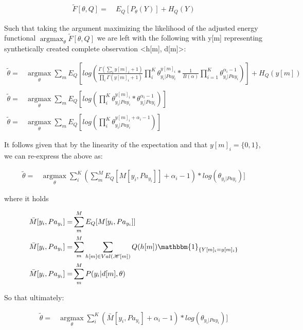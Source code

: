 \documentclass[11pt]{article}
\begin{document}
\begin{article}
\begin{align} \label{eq:dirichlet-multinomial-likelihood}
\tilde{F}[\theta, Q] =& \ E_Q[P_\theta(Y)] + H_Q (Y)
\end{align}

Such that taking the argument maximizing the likelihood of the
adjusted energy functional \(\operatorname*{argmax}_{\theta}
    \tilde{F}[\theta, Q]\) we are left with the following with y[m]
representing synthetically created complete observation <h[m],
d[m]>:

\begin{align} \label{eq:first-order-condition}
\tilde{\theta} =& \operatorname*{argmax}_{\theta} \sum_m E_Q[log(\frac{\Gamma(\sum_i y[m]_i + 1)}{\prod_i \Gamma(y[m]_i + 1)} \prod_i^K \theta_{y_i | Pa{y_i}}^{y[m]_i} * \frac{1}{B(\alpha)} \prod_{i=1}^K \theta_{y_i | Pa{y_i}}^{\alpha_i - 1})] + H_Q (y[m]) \\
\nonumber\\   
\tilde{\theta} =& \operatorname*{argmax}_{\theta} \sum_m E_Q[log(\prod_i^K \theta_{y_i | Pa{y_i}}^{y[m]_i} * \theta_{y_i | Pa{y_i}}^{\alpha_i - 1})]\\
\nonumber\\   
\tilde{\theta} =& \operatorname*{argmax}_{\theta} \sum_m E_Q[log(\prod_i^K \theta_{y_i | Pa{y_i}}^{y[m]_i + \alpha_i - 1})] 
\end{align}

It follows given that by the linearity of the expectation and that
\(y[m]_i = \{0,1\}\), we can re-express the above as:

\begin{align} \label{eq:solution1}
\tilde{\theta} =& \operatorname*{argmax}_{\theta} \sum_i^K (\sum_m^M E_Q[M[y_i, Pa_{y_i}]] + \alpha_i - 1) * log(\theta_{y_i | Pa{y_i}})] 
\end{align}

where it holds

\begin{align} \label{eq:expected_sufficient}
\bar{M}[y_i, Pa_{y_i}]  =& \sum_m^M E_Q[M[y_i, Pa_{y_i}]]\\
\bar{M}[y_i, Pa_{y_i}]  =& \sum_m^M \sum_{h[m] \in Val(\mathscr{H}[m])} Q(h[m]) \mathbbm{1}_{\{Y[m]_i = y[m]_i\}}\\
\bar{M}[y_i, Pa_{y_i}]  =& \sum_m^M P(y_i | d[m], \theta)
\end{align}

So that ultimately:

\begin{align} \label{eq:solution2}
\tilde{\theta} =& \operatorname*{argmax}_{\theta} \sum_i^K (\bar{M}[y_i, Pa_{y_i}] + \alpha_i - 1) * log(\theta_{y_i | Pa{y_i}})] 
\end{align}


\end{article}
\end{document}
